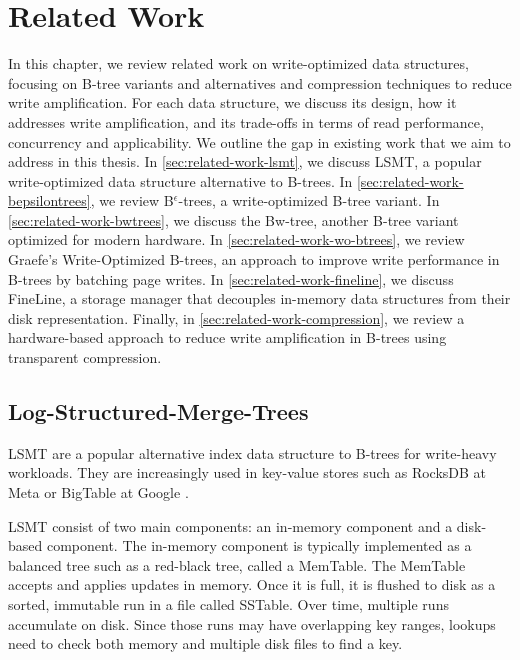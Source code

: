 \chapter{Related Work}
\label{chap:related-work}
In this chapter, we review related work on write-optimized data structures, focusing on B-tree variants and alternatives and compression techniques to reduce write amplification.
For each data structure, we discuss its design, how it addresses write amplification, and its trade-offs in terms of read performance, concurrency and applicability.
We outline the gap in existing work that we aim to address in this thesis.
In \autoref{sec:related-work-lsmt}, we discuss \ac{LSMT}, a popular write-optimized data structure alternative to B-trees.
In \autoref{sec:related-work-bepsilontrees}, we review B$^\epsilon$-trees, a write-optimized B-tree variant.
In \autoref{sec:related-work-bwtrees}, we discuss the Bw-tree, another B-tree variant optimized for modern hardware.
In \autoref{sec:related-work-wo-btrees}, we review Graefe's Write-Optimized B-trees, an approach to improve write performance in B-trees by batching page writes.
In \autoref{sec:related-work-fineline}, we discuss FineLine, a storage manager that decouples in-memory data structures from their disk representation.
Finally, in \autoref{sec:related-work-compression}, we review a hardware-based approach to reduce write amplification in B-trees using transparent compression.

\section{Log-Structured-Merge-Trees}
\label{sec:related-work-lsmt}
\ac{LSMT} \cite{oneil1996log} are a popular alternative index data structure to B-trees for write-heavy workloads.
They are increasingly used in key-value stores such as RocksDB at Meta \cite{rocksdb} or BigTable at Google \cite{chang2008bigtable}.

\ac{LSMT} consist of two main components: an in-memory component and a disk-based component.
The in-memory component is typically implemented as a balanced tree such as a red-black tree, called a MemTable.
The MemTable accepts and applies updates in memory.
Once it is full, it is flushed to disk as a sorted, immutable run in a file called SSTable.
Over time, multiple runs accumulate on disk.
Since those runs may have overlapping key ranges, lookups need to check both memory and multiple disk files to find a key.

